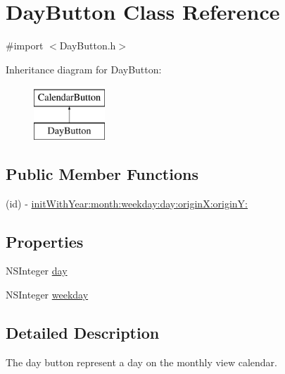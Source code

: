 \hypertarget{interface_day_button}{\section{\-Day\-Button \-Class \-Reference}
\label{interface_day_button}
}


{\ttfamily \#import $<$\-Day\-Button.\-h$>$}

\-Inheritance diagram for \-Day\-Button\-:\begin{figure}[H]
\begin{center}
\leavevmode
\includegraphics[height=2.000000cm]{interface_day_button}
\end{center}
\end{figure}
\subsection*{\-Public \-Member \-Functions}
\begin{DoxyCompactItemize}
\item 
(id) -\/ \hyperlink{interface_day_button_aaa3527d1ba28e02fbccf327df41bff5f}{init\-With\-Year\-:month\-:weekday\-:day\-:origin\-X\-:origin\-Y\-:}
\end{DoxyCompactItemize}
\subsection*{\-Properties}
\begin{DoxyCompactItemize}
\item 
\-N\-S\-Integer \hyperlink{interface_day_button_a1a1e6a38a27c7ffafcd2b47c9e677ce3}{day}
\item 
\-N\-S\-Integer \hyperlink{interface_day_button_a992bfe27780dcf5616639d4259a7b1b6}{weekday}
\end{DoxyCompactItemize}


\subsection{\-Detailed \-Description}
\-The day button represent a day on the monthly view calendar. 

